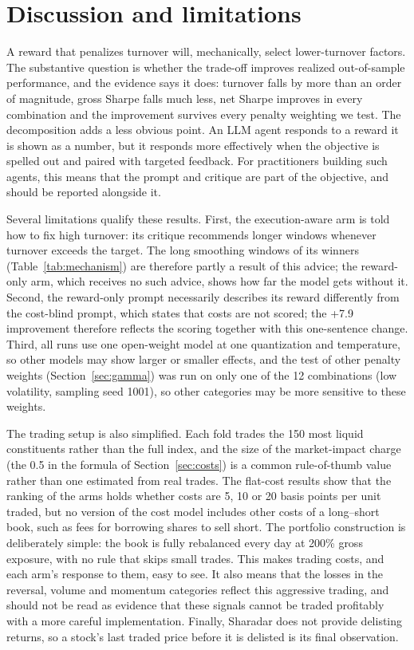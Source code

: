 \documentclass[preprint,12pt,authoryear]{elsarticle}
\begin{document}
\section{Discussion and limitations}\label{sec:discussion}

A reward that penalizes turnover will, mechanically, select lower-turnover factors. The substantive question is whether the trade-off improves realized out-of-sample performance, and the evidence says it does: turnover falls by more than an order of magnitude, gross Sharpe falls much less, net Sharpe improves in every combination and the improvement survives every penalty weighting we test. The decomposition adds a less obvious point. An LLM agent responds to a reward it is shown as a number, but it responds more effectively when the objective is spelled out and paired with targeted feedback. For practitioners building such agents, this means that the prompt and critique are part of the objective, and should be reported alongside it.

Several limitations qualify these results. First, the execution-aware arm is told how to fix high turnover: its critique recommends longer windows whenever turnover exceeds the target. The long smoothing windows of its winners (Table~\ref{tab:mechanism}) are therefore partly a result of this advice; the reward-only arm, which receives no such advice, shows how far the model gets without it. Second, the reward-only prompt necessarily describes its reward differently from the cost-blind prompt, which states that costs are not scored; the +7.9 improvement therefore reflects the scoring together with this one-sentence change. Third, all runs use one open-weight model at one quantization and temperature, so other models may show larger or smaller effects, and the test of other penalty weights (Section~\ref{sec:gamma}) was run on only one of the 12 combinations (low volatility, sampling seed 1001), so other categories may be more sensitive to these weights.

The trading setup is also simplified. Each fold trades the 150 most liquid constituents rather than the full index, and the size of the market-impact charge (the 0.5 in the formula of Section~\ref{sec:costs}) is a common rule-of-thumb value rather than one estimated from real trades. The flat-cost results show that the ranking of the arms holds whether costs are 5, 10 or 20 basis points per unit traded, but no version of the cost model includes other costs of a long--short book, such as fees for borrowing shares to sell short. The portfolio construction is deliberately simple: the book is fully rebalanced every day at 200\% gross exposure, with no rule that skips small trades. This makes trading costs, and each arm's response to them, easy to see. It also means that the losses in the reversal, volume and momentum categories reflect this aggressive trading, and should not be read as evidence that these signals cannot be traded profitably with a more careful implementation. Finally, Sharadar does not provide delisting returns, so a stock's last traded price before it is delisted is its final observation.
\end{document}
